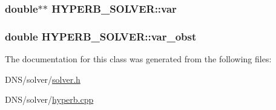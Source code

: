 \subsubsection[{\texorpdfstring{var}{var}}]{\setlength{\rightskip}{0pt plus 5cm}double$\ast$$\ast$ H\+Y\+P\+E\+R\+B\+\_\+\+S\+O\+L\+V\+E\+R\+::var}\hypertarget{class_h_y_p_e_r_b___s_o_l_v_e_r_ae09be12f2a6ba2ea90b89ec60f27bceb}{}\label{class_h_y_p_e_r_b___s_o_l_v_e_r_ae09be12f2a6ba2ea90b89ec60f27bceb}
\subsubsection[{\texorpdfstring{var\+\_\+obst}{var_obst}}]{\setlength{\rightskip}{0pt plus 5cm}double H\+Y\+P\+E\+R\+B\+\_\+\+S\+O\+L\+V\+E\+R\+::var\+\_\+obst}\hypertarget{class_h_y_p_e_r_b___s_o_l_v_e_r_a28ecbb9bbb2163ac76c453ab21155e17}{}\label{class_h_y_p_e_r_b___s_o_l_v_e_r_a28ecbb9bbb2163ac76c453ab21155e17}


The documentation for this class was generated from the following files\+:\begin{DoxyCompactItemize}
\item 
D\+N\+S/solver/\hyperlink{solver_8h}{solver.\+h}\item 
D\+N\+S/solver/\hyperlink{hyperb_8cpp}{hyperb.\+cpp}\end{DoxyCompactItemize}
